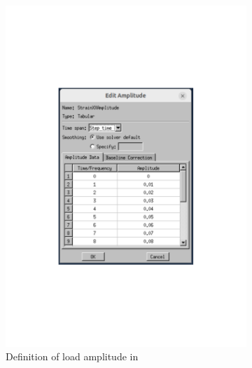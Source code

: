 \begin{figure}[H]
    \centering
    \begin{subfigure}[t]{0.35\textwidth}
        \centering
        \includegraphics[width=\linewidth]{Amplitude.pdf}
        \vfill{}
        \caption{ Definition of load amplitude in } %
        \label{fig:amplitudemenu}
    \end{subfigure}
    \hspace{0.08\textwidth}
    \begin{subfigure}[t]{0.35\textwidth}
        \centering

\end{subfigure}
\end{figure}
